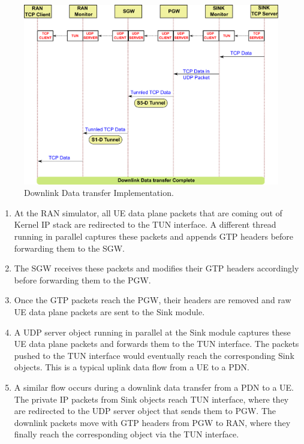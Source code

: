 \documentclass[hidelinks]{report}
\begin{document}
\begin{figure}[h]

\centering
\includegraphics[scale=0.5]{nfv_downlink_transfer}
\caption{Downlink Data transfer Implementation.}
\label{nfv_downlink_transfer}

\end{figure}

\begin{enumerate}

\item At the RAN simulator, all UE data plane packets that are coming out of Kernel IP stack are redirected to the TUN interface. A different thread running in parallel captures these packets and appends GTP headers before forwarding them to the SGW.

\item The SGW receives these packets and modifies their GTP headers accordingly before forwarding them to the PGW.

\item Once the GTP packets reach the PGW, their headers are removed and raw UE data plane packets are sent to the Sink module.

\item A UDP server object running in parallel at the Sink module captures these UE data plane packets and forwards them to the TUN interface. The packets pushed to the TUN interface would eventually reach the corresponding Sink objects. This is a typical uplink data flow from a UE to a PDN.

\item A similar flow occurs during a downlink data transfer from a PDN to a UE. The private IP packets from Sink objects reach TUN interface, where they are redirected to the UDP server object that sends them to PGW. The downlink packets move with GTP headers from PGW to RAN, where they finally reach the corresponding object via the TUN interface.

\end{enumerate}
\end{document}
